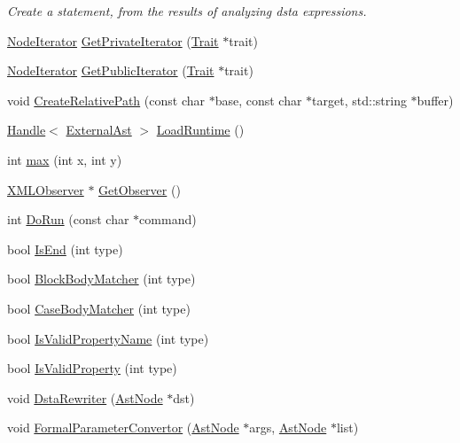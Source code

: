 \begin{DoxyCompactItemize}
\begin{DoxyCompactList}\small\item\em Create a statement, from the results of analyzing dsta expressions. \end{DoxyCompactList}\item 
\hyperlink{classmocha_1_1_node_iterator}{NodeIterator} \hyperlink{namespacemocha_a34095d7dde21c0fbd11831cd91456a4a}{GetPrivateIterator} (\hyperlink{classmocha_1_1_trait}{Trait} $\ast$trait)
\item 
\hyperlink{classmocha_1_1_node_iterator}{NodeIterator} \hyperlink{namespacemocha_a2911abdd415c4eeba20d9b7749141684}{GetPublicIterator} (\hyperlink{classmocha_1_1_trait}{Trait} $\ast$trait)
\item 
void \hyperlink{namespacemocha_adb5d6830511302a05dd62a19af8c7ba5}{CreateRelativePath} (const char $\ast$base, const char $\ast$target, std::string $\ast$buffer)
\item 
\hyperlink{classmocha_1_1_handle}{Handle}$<$ \hyperlink{classmocha_1_1_external_ast}{ExternalAst} $>$ \hyperlink{namespacemocha_a6c197957e42f7bb0daec9a833c4ebf05}{LoadRuntime} ()
\item 
int \hyperlink{namespacemocha_ab521514c126e2bd14de66d87814eb525}{max} (int x, int y)
\item 
\hyperlink{classmocha_1_1_x_m_l_observer}{XMLObserver} $\ast$ \hyperlink{namespacemocha_abf14990e073fac36f9d03b9c17e03bf7}{GetObserver} ()
\item 
int \hyperlink{namespacemocha_a8075ee74aebde2f92a3bffb2626d87b7}{DoRun} (const char $\ast$command)
\item 
bool \hyperlink{namespacemocha_a1c471e61d003f2dd1f8cf30b4ef1a243}{IsEnd} (int type)
\item 
bool \hyperlink{namespacemocha_ae8e1e91b0bea2b9a6d64f637247c3810}{BlockBodyMatcher} (int type)
\item 
bool \hyperlink{namespacemocha_abc0457546c1d680de648d0c0f1de1935}{CaseBodyMatcher} (int type)
\item 
bool \hyperlink{namespacemocha_a92c6ed1a0cd18b38f66db08a2cbc7295}{IsValidPropertyName} (int type)
\item 
bool \hyperlink{namespacemocha_a80f42ad761cf540fb37b1c2cc0aac58b}{IsValidProperty} (int type)
\item 
void \hyperlink{namespacemocha_a933f9b4800ea62a994bbdeecf54d9323}{DstaRewriter} (\hyperlink{classmocha_1_1_ast_node}{AstNode} $\ast$dst)
\item 
void \hyperlink{namespacemocha_a2b8ef0a2868c52e6dc6b3c542fb3e49e}{FormalParameterConvertor} (\hyperlink{classmocha_1_1_ast_node}{AstNode} $\ast$args, \hyperlink{classmocha_1_1_ast_node}{AstNode} $\ast$list)

\end{DoxyCompactItemize}
